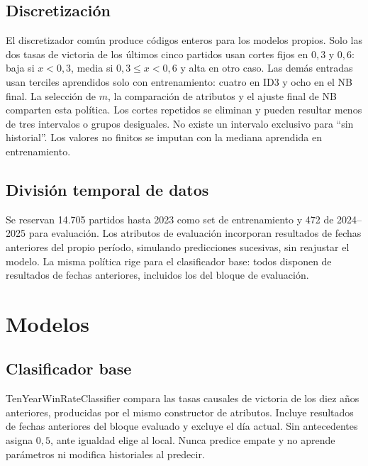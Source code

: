 \documentclass[conference]{IEEEtran}
\begin{document}
\subsection{Discretización}
El discretizador común produce códigos enteros para los modelos propios. Solo las dos tasas de victoria de los últimos cinco partidos usan cortes fijos en $0{,}3$ y $0{,}6$: baja si $x<0{,}3$, media si $0{,}3\leq x<0{,}6$ y alta en otro caso. Las demás entradas usan terciles aprendidos solo con entrenamiento: cuatro en ID3 y ocho en el NB final. La selección de $m$, la comparación de atributos y el ajuste final de NB comparten esta política. Los cortes repetidos se eliminan y pueden resultar menos de tres intervalos o grupos desiguales. No existe un intervalo exclusivo para ``sin historial''. Los valores no finitos se imputan con la mediana aprendida en entrenamiento.

\subsection{División temporal de datos}
Se reservan 14.705 partidos hasta 2023 como set de entrenamiento y 472 de 2024--2025 para evaluación. Los atributos de evaluación incorporan resultados de fechas anteriores del propio período, simulando predicciones sucesivas, sin reajustar el modelo. La misma política rige para el clasificador base: todos disponen de resultados de fechas anteriores, incluidos los del bloque de evaluación.

\section{Modelos}
\label{sec:modelos}

\subsection{Clasificador base}
TenYearWinRateClassifier compara las tasas causales de victoria de los diez años anteriores, producidas por el mismo constructor de atributos. Incluye resultados de fechas anteriores del bloque evaluado y excluye el día actual. Sin antecedentes asigna $0{,}5$, ante igualdad elige al local. Nunca predice empate y no aprende parámetros ni modifica historiales al predecir.
\end{document}
